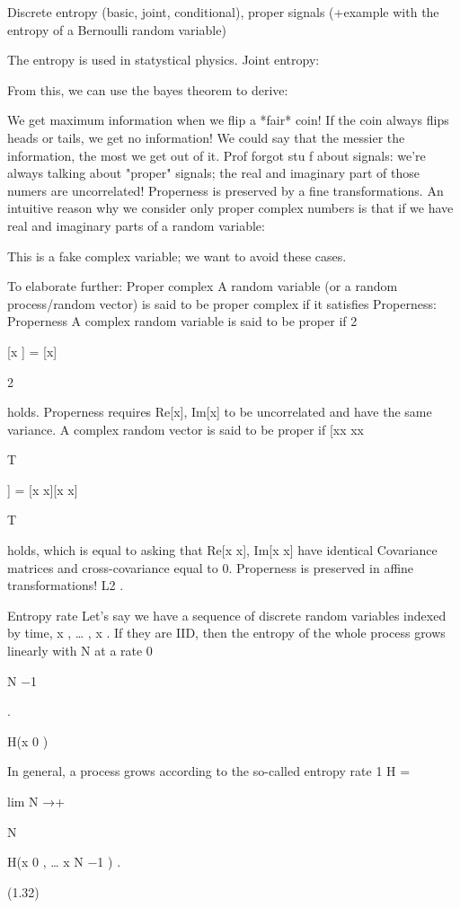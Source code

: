 Discrete entropy (basic, joint, conditional), proper signals (+example with the entropy of a Bernoulli random variable)

The entropy is used in statystical physics.
Joint entropy:

From this, we can use the bayes theorem to derive:

We get maximum information when we flip a *fair* coin!
If the coin always flips heads or tails, we get no information!
We could say that the messier the information, the most we get out of it.
Prof forgot stu f about signals: we're always talking about "proper" signals; the real and imaginary part of those numers are uncorrelated!
Properness is preserved by a fine transformations. An intuitive reason why we consider only proper complex numbers is that if we have real and imaginary parts of a random variable:

This is a fake complex variable; we want to avoid these cases.

To elaborate further:
Proper complex A random variable (or a random process/random vector) is said to be proper complex if it satisfies Properness:
Properness A complex random variable is said to be proper if 2

[x ] = [x]

2

holds.
Properness requires Re[x], Im[x] to be uncorrelated and have the same variance.
A complex random vector is said to be proper if [xx xx

T

] = [x x][x x]

T

holds, which is equal to asking that Re[x x], Im[x x] have identical Covariance matrices and cross-covariance equal to 0.
Properness is preserved in affine transformations!
L2
.

Entropy rate Let's say we have a sequence of discrete random variables indexed by time, x , … , x
.
If they are IID, then the entropy of the whole process grows linearly with N at a rate 0

N −1

.

H(x 0 )

In general, a process grows according to the so-called entropy rate 1 H =

lim N →+\infty

N

H(x 0 , … x N −1 ) .

(1.32)

